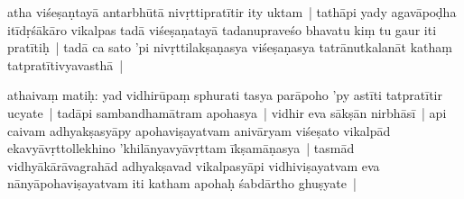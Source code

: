\documentclass[article,12pt,a4paper]{memoir}%
\newcounter{parCount}
\begin{document}
	  \pstart \leavevmode%
	\label{thakur75-58.23}atha viśeṣaṇtayā antarbhūtā nivṛttipratītir ity uktam | tathāpi yady agavāpoḍha itīdṛśākāro vikalpas tadā viśeṣaṇatayā tadanupraveśo bhavatu kiṃ tu gaur iti pratītiḥ | tadā ca sato 'pi nivṛttilakṣaṇasya viśeṣaṇasya tatrānutkalanāt kathaṃ tatpratītivyavasthā |
	{}
	\pend%
      

	  \pstart \leavevmode%
	\label{thakur75-58.27}athaivaṃ matiḥ: yad vidhirūpaṃ sphurati tasya parāpoho 'py astīti tatpratītir ucyate | tadāpi sambandhamātram apohasya | vidhir eva sākṣān nirbhāsī | api caivam adhyakṣasyāpy apohaviṣayatvam anivāryam viśeṣato vikalpād ekavyāvṛttollekhino 'khilānyavyāvṛttam īkṣamāṇasya | tasmād vidhyākārāvagrahād adhyakṣavad vikalpasyāpi vidhiviṣayatvam eva nānyāpohaviṣayatvam iti katham apohaḥ śabdārtho ghuṣyate | 
	{}
	\pend%
      
\end{document}
